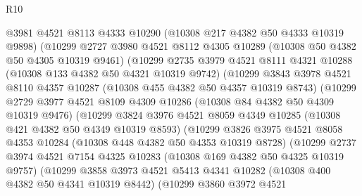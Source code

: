 \begin{lexlean}{R10}
\begin{coremodule}
                @3981
                @4521
                @8113
                @4333
                @10290
                (@10308 @217 @4382 @50 @4333 @10319 @9898)
                (@10299
                  @2727
                  @3980
                  @4521
                  @8112
                  @4305
                  @10289
                  (@10308 @50 @4382 @50 @4305 @10319 @9461)
                  (@10299
                    @2735
                    @3979
                    @4521
                    @8111
                    @4321
                    @10288
                    (@10308 @133 @4382 @50 @4321 @10319 @9742)
                    (@10299
                      @3843
                      @3978
                      @4521
                      @8110
                      @4357
                      @10287
                      (@10308 @455 @4382 @50 @4357 @10319 @8743)
                      (@10299
                        @2729
                        @3977
                        @4521
                        @8109
                        @4309
                        @10286
                        (@10308 @84 @4382 @50 @4309 @10319 @9476)
                        (@10299
                          @3824
                          @3976
                          @4521
                          @8059
                          @4349
                          @10285
                          (@10308 @421 @4382 @50 @4349 @10319 @8593)
                          (@10299
                            @3826
                            @3975
                            @4521
                            @8058
                            @4353
                            @10284
                            (@10308 @448 @4382 @50 @4353 @10319 @8728)
                            (@10299
                              @2737
                              @3974
                              @4521
                              @7154
                              @4325
                              @10283
                              (@10308 @169 @4382 @50 @4325 @10319 @9757)
                              (@10299
                                @3858
                                @3973
                                @4521
                                @5413
                                @4341
                                @10282
                                (@10308 @400 @4382 @50 @4341 @10319 @8442)
                                (@10299
                                  @3860
                                  @3972
                                  @4521

\end{coremodule}
\end{lexlean}
